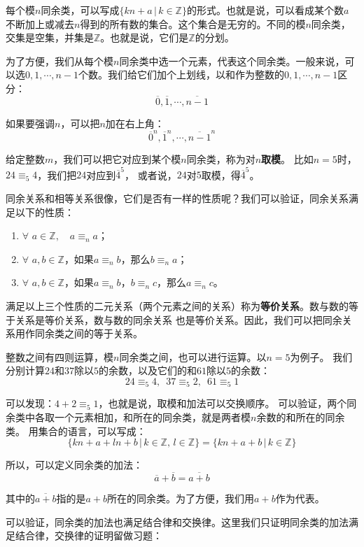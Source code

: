 \documentclass[12pt,UTF8]{ctexbook}
\begin{document}
每个模$n$同余类，可以写成$\{kn + a \, | \, k\in\mathbb{Z} \}$的形式。也就是说，可以看成某个数$a$不断加上或减去$n$得到的所有数的集合。这个集合是无穷的。不同的模$n$同余类，交集是空集，并集是$\mathbb{Z}$。也就是说，它们是$\mathbb{Z}$的分划。

为了方便，我们从每个模$n$同余类中选一个元素，代表这个同余类。一般来说，可以选$0,1,\cdots,n-1$个数。我们给它们加个上划线，以和作为整数的$0,1,\cdots,n-1$区分：
$$\overline{0},\overline{1},\cdots,\overline{n-1}$$

如果要强调$n$，可以把$n$加在右上角：
$$\overline{0}^n,\overline{1}^n,\cdots,\overline{n-1}^n$$

给定整数$m$，我们可以把它对应到某个模$n$同余类，称为对$n$\textbf{取模}。
比如$n=5$时，$24 \equiv_5 4$，我们把$24$对应到$\overline{4}^5$，
或者说，$24$对$5$取模，得$\overline{4}^5$。

同余关系和相等关系很像，它们是否有一样的性质呢？我们可以验证，同余关系满足以下的性质：
\begin{enumerate}
    \item $\forall \,\, a\in \mathbb{Z}, \quad a \equiv_n a$；
    \item $\forall \,\, a, b \in \mathbb{Z}$，如果$a \equiv_n b$，那么$b \equiv_n a$；
    \item $\forall \,\, a, b \in \mathbb{Z}$，如果$a \equiv_n b$，$b \equiv_n c$，那么$a \equiv_n c$。
\end{enumerate}

满足以上三个性质的二元关系（两个元素之间的关系）称为\textbf{等价关系}。数与数的等于关系是等价关系，数与数的同余关系
也是等价关系。因此，我们可以把同余关系用作同余类之间的等于关系。

整数之间有四则运算，模$n$同余类之间，也可以进行运算。以$n=5$为例子。
我们分别计算$24$和$37$除以$5$的余数，以及它们的和$61$除以$5$的余数：
$$ 24 \equiv_5 4, \,\,\, 37 \equiv_5 2 , \,\,\, 61 \equiv_5 1$$

可以发现：$ 4 + 2 \equiv_5 1$，也就是说，取模和加法可以交换顺序。
可以验证，两个同余类中各取一个元素相加，和所在的同余类，就是两者模$n$余数的和所在的同余类。
用集合的语言，可以写成：
$$\{kn + a + ln + b \, | \, k\in\mathbb{Z}, \, l\in\mathbb{Z} \} = \{kn + a + b \, | \, k\in\mathbb{Z} \}$$

所以，可以定义同余类的加法：
$$ \overline{a} + \overline{b} = \overline{a + b}$$

其中的$\overline{a + b}$指的是$a+b$所在的同余类。为了方便，我们用$a + b$作为代表。

可以验证，同余类的加法也满足结合律和交换律。这里我们只证明同余类的加法满足结合律，交换律的证明留做习题：
\end{document}
